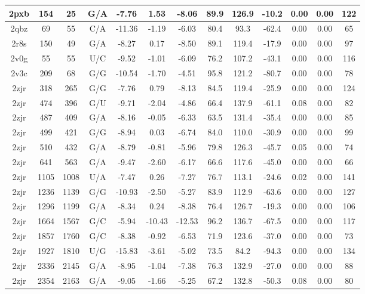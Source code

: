 {\begin{center}
\begin{longtable}{|c|c|c|c|c|c|c|c|c|c|c|c|c|}
2pxb & 154 & 25 & G/A & -7.76 & 1.53 & -8.06 & 89.9 & 126.9 & -10.2 & 0.00 & 0.00 & 122 \\ \hline
2qbz & 69 & 55 & C/A & -11.36 & -1.19 & -6.03 & 80.4 & 93.3 & -62.4 & 0.00 & 0.00 & 65 \\ \hline
2r8s & 150 & 49 & G/A & -8.27 & 0.17 & -8.50 & 89.1 & 119.4 & -17.9 & 0.00 & 0.00 & 97 \\ \hline
2v0g & 55 & 55 & U/C & -9.52 & -1.01 & -6.09 & 76.2 & 107.2 & -43.1 & 0.00 & 0.00 & 116 \\ \hline
2v3c & 209 & 68 & G/G & -10.54 & -1.70 & -4.51 & 95.8 & 121.2 & -80.7 & 0.00 & 0.00 & 78 \\ \hline
2zjr & 318 & 265 & G/G & -7.76 & 0.79 & -8.13 & 84.5 & 119.4 & -25.9 & 0.00 & 0.00 & 124 \\ \hline
2zjr & 474 & 396 & G/U & -9.71 & -2.04 & -4.86 & 66.4 & 137.9 & -61.1 & 0.08 & 0.00 & 82 \\ \hline
2zjr & 487 & 409 & G/A & -8.16 & -0.05 & -6.33 & 63.5 & 131.4 & -35.4 & 0.00 & 0.00 & 85 \\ \hline
2zjr & 499 & 421 & G/G & -8.94 & 0.03 & -6.74 & 84.0 & 110.0 & -30.9 & 0.00 & 0.00 & 99 \\ \hline
2zjr & 510 & 432 & G/A & -8.79 & -0.81 & -5.96 & 79.8 & 126.3 & -45.7 & 0.05 & 0.00 & 74 \\ \hline
2zjr & 641 & 563 & G/A & -9.47 & -2.60 & -6.17 & 66.6 & 117.6 & -45.0 & 0.00 & 0.00 & 66 \\ \hline
2zjr & 1105 & 1008 & U/A & -7.47 & 0.26 & -7.27 & 76.7 & 113.1 & -24.6 & 0.02 & 0.00 & 141 \\ \hline
2zjr & 1236 & 1139 & G/G & -10.93 & -2.50 & -5.27 & 83.9 & 112.9 & -63.6 & 0.00 & 0.00 & 127 \\ \hline
2zjr & 1296 & 1199 & G/A & -8.34 & 0.24 & -8.38 & 76.4 & 126.7 & -19.3 & 0.00 & 0.00 & 106 \\ \hline
2zjr & 1664 & 1567 & G/C & -5.94 & -10.43 & -12.53 & 96.2 & 136.7 & -67.5 & 0.00 & 0.00 & 117 \\ \hline
2zjr & 1857 & 1760 & G/C & -8.38 & -0.92 & -6.53 & 71.9 & 123.6 & -37.0 & 0.00 & 0.00 & 73 \\ \hline
2zjr & 1927 & 1810 & U/G & -15.83 & -3.61 & -5.02 & 73.5 & 84.2 & -94.3 & 0.00 & 0.00 & 134 \\ \hline
2zjr & 2336 & 2145 & G/A & -8.95 & -1.04 & -7.38 & 76.3 & 132.9 & -27.0 & 0.00 & 0.00 & 88 \\ \hline
2zjr & 2354 & 2163 & G/A & -9.05 & -1.66 & -5.25 & 67.2 & 132.8 & -50.3 & 0.08 & 0.00 & 80 \\ \hline

\end{longtable}
\end{center}}
